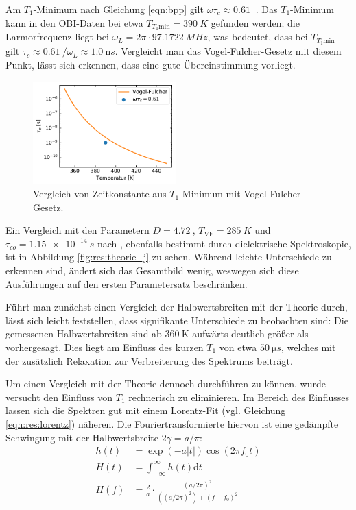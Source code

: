 Am $T_1$-Minimum nach Gleichung \eqref{eqn:bpp} gilt $\omega \tau_c \approx \SI{0.61}{}$ \cite[S. 629]{omegatau061}. Das $T_1$-Minimum kann in den OBI-Daten bei etwa $T_{T_1 \text{min}} = \SI{390}{K}$ gefunden werden; die Larmorfrequenz liegt bei $\omega_L = 2\pi \cdot \SI{97.1722}{MHz}$, was bedeutet, dass bei $T_{T_1 \text{min}}$ gilt $\tau_c \approx \SI{0.61}{} / \omega_L \approx \SI{1.0}{\nano s}$. Vergleicht man das Vogel-Fulcher-Gesetz mit diesem Punkt, lässt sich erkennen, dass eine gute Übereinstimmung vorliegt.

\begin{figure}
	\vspace{-20pt}
	\begin{center}
		\includegraphics[width=0.49\textwidth]{graphics/plot/vftau.pdf}
	\end{center}
	\vspace{-20pt}
	\caption{Vergleich von Zeitkonstante aus $T_1$-Minimum mit Vogel-Fulcher-Gesetz. \label{fig:korrelationszeiten}}
\end{figure}

Ein Vergleich mit den Parametern $D = \SI{4.72}{}$, $T_\text{VF} = \SI{285}{K}$ und $\tau_{co} = \SI{1.15e-14}{s}$ nach \cite{crn_augsburg}, ebenfalls bestimmt durch dielektrische Spektroskopie, ist in Abbildung \ref{fig:res:theorie_j} zu sehen. Während leichte Unterschiede zu erkennen sind, ändert sich das Gesamtbild wenig, weswegen sich diese Ausführungen auf den ersten Parametersatz beschränken.




Führt man zunächst einen Vergleich der Halbwertsbreiten mit der Theorie durch, lässt sich leicht feststellen, dass signifikante Unterschiede zu beobachten sind: Die gemessenen Halbwertsbreiten sind ab $\SI{360}{\kelvin}$ aufwärts deutlich größer als vorhergesagt. Dies liegt am Einfluss des kurzen $T_1$ von etwa $\SI{50}{\micro s}$, welches mit der zusätzlich Relaxation zur Verbreiterung des Spektrums beiträgt.

Um einen Vergleich mit der Theorie dennoch durchführen zu können, wurde versucht den Einfluss von $T_1$ rechnerisch zu eliminieren. Im Bereich des Einflusses lassen sich die Spektren gut mit einem Lorentz-Fit (vgl. Gleichung \eqref{eqn:res:lorentz}) näheren. Die Fouriertransformierte hiervon ist eine gedämpfte Schwingung mit der Halbwertsbreite $2 \gamma = a/\pi$:
\begin{align}
	h(t) & = \exp{(-a |t|)} \cos{(2 \pi f_0 t)} \\
	H(t) & = \int_{-\infty}^{\infty} h(t) \text{d} t \\
	H(f) & = \frac{2}{a} \cdot \frac{(a/2\pi)^2}{((a/2\pi)^2) + (f - f_0)^2}
\end{align}

